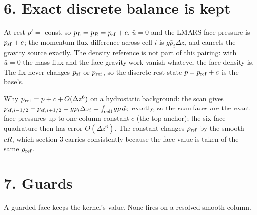 \documentclass[11pt,a4paper]{article}
\begin{document}
\section*{6. Exact discrete balance is kept}

At rest $p' = $ const, so $p_L = p_R = p_{\rm sf} + c$, $\bar u = 0$ and the LMARS face pressure is
$p_{\rm sf} + c$; the momentum-flux difference across cell $i$ is $g\bar\rho_i\Delta z_i$ and cancels the gravity
source exactly. The density reference is not part of this pairing: with $\bar u = 0$ the mass flux and the
face gravity work vanish whatever the face density is. The fix never changes $p_{\rm sf}$ or $p_{\rm ref}$, so
the discrete rest state $\bar p = p_{\rm ref} + c$ is the base's.

Why $p_{\rm ref} = \bar p + c + O(\Delta z^6)$ on a hydrostatic background: the scan gives
$p_{{\rm sf},i-1/2} - p_{{\rm sf},i+1/2} = g\bar\rho_i\Delta z_i = \int_{\rm cell} g\rho\,dz$ exactly, so the scan
faces are the exact face pressures up to one column constant $c$ (the top anchor); the six-face quadrature
then has error $O(\Delta z^6)$. The constant changes $\rho_{\rm ref}$ by the smooth $cR$, which section 3
carries consistently because the face value is taken of the same $\rho_{\rm ref}$.

\section*{7. Guards}

A guarded face keeps the kernel's value. None fires on a resolved smooth column.
\end{document}

